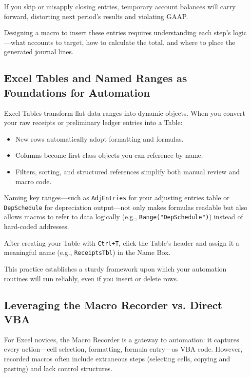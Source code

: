 \begin{Warning}
If you skip or misapply closing entries, temporary account balances will carry forward, distorting next period’s results and violating GAAP.
\end{Warning}

Designing a macro to insert these entries requires understanding each step’s logic—what accounts to target, how to calculate the total, and where to place the generated journal lines.

\subsection{Excel Tables and Named Ranges as Foundations for Automation}
Excel Tables transform flat data ranges into dynamic objects. When you convert your raw receipts or preliminary ledger entries into a Table:
\begin{itemize}
  \item New rows automatically adopt formatting and formulas.  
  \item Columns become first-class objects you can reference by name.  
  \item Filters, sorting, and structured references simplify both manual review and macro code.
\end{itemize}

Naming key ranges—such as \texttt{AdjEntries} for your adjusting entries table or \texttt{DepSchedule} for depreciation output—not only makes formulas readable but also allows macros to refer to data logically (e.g., \verb|Range("DepSchedule")|) instead of hard-coded addresses.

\begin{Tip}
After creating your Table with \texttt{Ctrl+T}, click the Table’s header and assign it a meaningful name (e.g., \texttt{ReceiptsTbl}) in the Name Box.
\end{Tip}

This practice establishes a sturdy framework upon which your automation routines will run reliably, even if you insert or delete rows.

\subsection{Leveraging the Macro Recorder vs. Direct VBA}
For Excel novices, the Macro Recorder is a gateway to automation: it captures every action—cell selection, formatting, formula entry—as VBA code. However, recorded macros often include extraneous steps (selecting cells, copying and pasting) and lack control structures.

